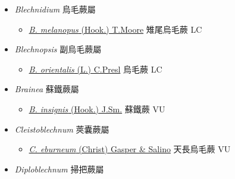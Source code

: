 
  \begin{itemize}
 \item[] \textit{Blechnidium} 烏毛蕨屬
                    
  \begin{itemize}
        \item[] \href{http://www.theplantlist.org/tpl1.1/search?q=Blechnidium+melanopus}{\textit{B. melanopus} (Hook.) T.Moore}     雉尾烏毛蕨 LC
  \end{itemize}
 \item[] \textit{Blechnopsis} 副烏毛蕨屬
                    
  \begin{itemize}
        \item[] \href{http://www.theplantlist.org/tpl1.1/search?q=Blechnopsis+orientalis}{\textit{B. orientalis} (L.) C.Presl}     烏毛蕨 LC
  \end{itemize}
 \item[] \textit{Brainea} 蘇鐵蕨屬
                    
  \begin{itemize}
        \item[] \href{http://www.theplantlist.org/tpl1.1/search?q=Brainea+insignis}{\textit{B. insignis} (Hook.) J.Sm.}   蘇鐵蕨 VU
  \end{itemize}
 \item[] \textit{Cleistoblechnum} 莢囊蕨屬
                    
  \begin{itemize}
        \item[] \href{http://www.theplantlist.org/tpl1.1/search?q=Cleistoblechnum+eburneum}{\textit{C. eburneum} (Christ) Gasper \& Salino}     天長烏毛蕨 VU
  \end{itemize}
 \item[] \textit{Diploblechnum} 掃把蕨屬
                    

\end{itemize}
